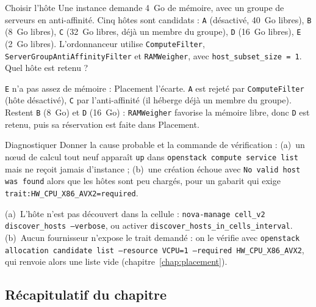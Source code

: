 \begin{exercice}{Choisir l'hôte}\label{ex:nova-hote}
Une instance demande 4~Go de mémoire, avec un groupe de serveurs en anti-affinité. Cinq hôtes sont candidats :
\texttt{A} (désactivé, 40~Go libres), \texttt{B} (8~Go libres), \texttt{C} (32~Go libres, déjà un membre du groupe),
\texttt{D} (16~Go libres), \texttt{E} (2~Go libres). L'ordonnanceur utilise \texttt{ComputeFilter},
\texttt{ServerGroupAntiAffinityFilter} et \texttt{RAMWeigher}, avec \texttt{host\_subset\_size = 1}. Quel hôte est retenu ?
\end{exercice}
\begin{correction}
\texttt{E} n'a pas assez de mémoire : Placement l'écarte. \texttt{A} est rejeté par \texttt{ComputeFilter} (hôte
désactivé), \texttt{C} par l'anti-affinité (il héberge déjà un membre du groupe). Restent \texttt{B} (8~Go) et \texttt{D}
(16~Go) : \texttt{RAMWeigher} favorise la mémoire libre, donc \texttt{D} est retenu, puis sa réservation est faite
dans Placement.
\end{correction}

\begin{exercice}{Diagnostiquer}\label{ex:nova-diag}
Donner la cause probable et la commande de vérification : (a)~un nœud de calcul tout neuf apparaît \texttt{up} dans
\texttt{openstack compute service list} mais ne reçoit jamais d'instance ; (b)~une création échoue avec
\texttt{No valid host was found} alors que les hôtes sont peu chargés, pour un gabarit qui exige
\texttt{trait:HW\_CPU\_X86\_AVX2=required}.
\end{exercice}
\begin{correction}
(a)~L'hôte n'est pas découvert dans la cellule : \texttt{nova-manage cell\_v2 discover\_hosts --verbose}, ou activer
\texttt{discover\_hosts\_in\_cells\_interval}. (b)~Aucun fournisseur n'expose le trait demandé : on le vérifie avec
\texttt{openstack allocation candidate list --resource VCPU=1 --required HW\_CPU\_X86\_AVX2}, qui renvoie alors une liste
vide (chapitre~\ref{chap:placement}).
\end{correction}

\subsection{Récapitulatif du chapitre}\label{sec:nova-recap}

